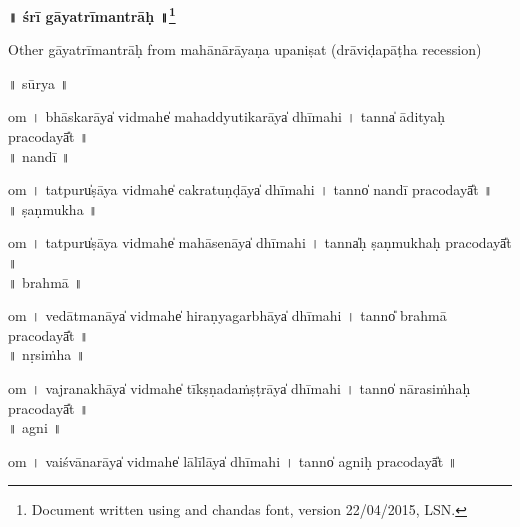 \documentclass[parskip, DIV=14]{scrartcl}
\renewcommand{\thefootnote}{\fnsymbol{footnote}} %
\begin{document}

\vspace{-1.5cm}

\begin{center}
\textbf{{\Huge\vspace{0.201cm} ॥  śrī gā॒yatrīmantrāḥ॒ ॥\LARGE\let\thefootnote\relax\footnote{\color{lightgray} Document written using \XeLaTeX{} and chandas font, version 22/04/2015, LSN.}}}
\end{center}
\Large


\vspace{1.001cm} 

\LARGE Other gāyatrīmantrāḥ from mahānārāyaṇa upaniṣat (drāviḍapāṭha recession) \par

\Large 

\vspace{1.501cm} ॥   sūrya  ॥ \par
  om  । bhā॒ska॒rāya̍ vi॒dmahe̍ mahaddyutika॒rāya̍ dhīmahi  ।  tanna̍ ādityaḥ praco॒dayā̎t ॥ \\


\vspace{0.201cm} ॥   nandī  ॥ \par
  om  । tatpuru̍ṣāya vi॒dmahe̍ cakratu॒ṇḍāya̍ dhīmahi  ।  tanno̍ nandī praco॒dayā̎t ॥ \\

\vspace{0.201cm} ॥   ṣaṇmukha  ॥ \par
  om  । tatpuru̍ṣāya vi॒dmahe̍ mahāse॒nāya̍ dhīmahi  ।  tanna̍ḥ ṣaṇmukhaḥ praco॒dayā̎t ॥ \\

\vspace{0.201cm} ॥   brahmā  ॥ \par
  om  । ve॒dā॒tma॒nāya̍ vi॒dmahe̍ hiraṇyaga॒rbhāya̍ dhīmahi  ।  tanno̎ brahmā praco॒dayā̎t ॥ \\

\vspace{0.201cm} ॥   nṛsiṁha  ॥ \par  
  om  । va॒jra॒na॒khāya̍ vi॒dmahe̍ tīkṣṇada॒ṁṣṭrāya̍ dhīmahi  ।  tanno̍ nārasiṁhaḥ praco॒dayā̎t ॥ \\

\vspace{0.201cm} ॥   agni  ॥ \par
  om  । vai॒śvā॒na॒rāya̍ vi॒dmahe̍ lālī॒lāya̍ dhīmahi  ।  tanno̍ agniḥ praco॒dayā̎t ॥ \\
\end{document}

